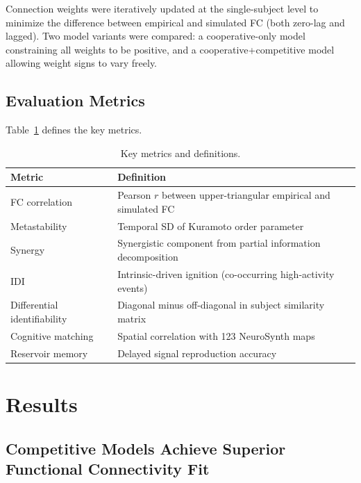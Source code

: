 \documentclass[11pt]{article}
\begin{document}
Connection weights were iteratively updated at the single-subject level to minimize the difference between empirical and simulated FC (both zero-lag and lagged).  Two model variants were compared: a cooperative-only model constraining all weights to be positive, and a cooperative+competitive model allowing weight signs to vary freely.

\subsection{Evaluation Metrics}

Table~\ref{tab:metrics} defines the key metrics.

\begin{table}[ht]
\centering
\caption{Key metrics and definitions.}
\label{tab:metrics}
\begin{tabular}{@{}lp{10cm}@{}}
\toprule
Metric & Definition \\
\midrule
FC correlation & Pearson $r$ between upper-triangular empirical and simulated FC \\
Metastability & Temporal SD of Kuramoto order parameter~\citep{kuramoto1975self} \\
Synergy & Synergistic component from partial information decomposition~\citep{williams2019partial} \\
IDI & Intrinsic-driven ignition (co-occurring high-activity events) \\
Differential identifiability & Diagonal minus off-diagonal in subject similarity matrix~\citep{amico2018fingerprint} \\
Cognitive matching & Spatial correlation with 123 NeuroSynth maps~\citep{yarkoni2011neurosynth} \\
Reservoir memory & Delayed signal reproduction accuracy~\citep{jaeger2001echo,maass2002real} \\
\bottomrule
\end{tabular}
\end{table}

\section{Results}

\subsection{Competitive Models Achieve Superior Functional Connectivity Fit}
\end{document}
